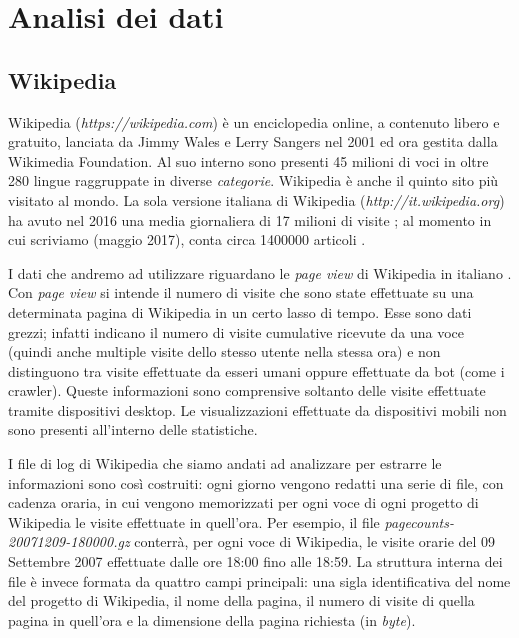 \chapter{Analisi dei dati}
\bigskip

\section{Wikipedia}
\bigskip
Wikipedia (\textit{https://wikipedia.com}) è un enciclopedia online, a contenuto libero e gratuito, lanciata da Jimmy 
Wales e Lerry Sangers nel 2001 ed ora gestita dalla Wikimedia Foundation. Al suo interno sono presenti 45 milioni di voci in 
oltre 280 lingue raggruppate in diverse \textit{categorie}. Wikipedia è anche il quinto sito più visitato al mondo. La sola 
versione italiana di Wikipedia (\textit{http://it.wikipedia.org}) ha avuto nel 2016  una media giornaliera di 17 milioni di 
visite \cite{it_wikipedia_views_2016}; al momento in cui scriviamo (maggio 2017), conta circa 1400000 articoli 
\cite{wikipedia_stats}.
\bigskip

I dati che andremo ad utilizzare riguardano le \textit{page view} di Wikipedia in italiano \cite{wikipedia_pageviews}. Con 
\textit{page view} si intende il numero di visite che sono state effettuate su una determinata pagina di Wikipedia in un 
certo lasso di tempo. Esse sono dati grezzi; infatti indicano il numero di visite cumulative ricevute da una voce (quindi 
anche multiple visite dello stesso utente nella stessa ora) e non distinguono tra visite effettuate da esseri umani oppure 
effettuate da bot (come i crawler). Queste informazioni sono comprensive soltanto delle visite effettuate tramite dispositivi 
desktop. Le visualizzazioni effettuate da dispositivi mobili non sono presenti all'interno delle statistiche.
\bigskip

I file di log di Wikipedia che siamo andati ad analizzare per estrarre le informazioni sono così costruiti: ogni giorno 
vengono redatti una serie di file, con cadenza oraria, in cui vengono memorizzati per ogni voce di ogni progetto di Wikipedia 
le visite effettuate in quell'ora. Per esempio, il file \textit{pagecounts-20071209-180000.gz} conterrà, per ogni voce di 
Wikipedia, le visite orarie del 09 Settembre 2007 effettuate dalle ore 18:00 fino alle 18:59. La struttura interna dei file è 
invece formata da quattro campi principali: una sigla identificativa del nome del progetto di Wikipedia, il nome della 
pagina, il numero di visite di quella pagina in quell'ora e la dimensione della pagina richiesta (in \textit{byte}).
\bigskip 
  
